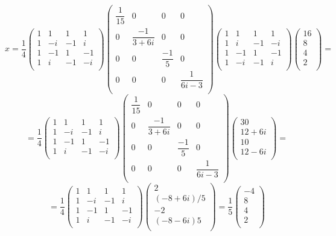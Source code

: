 \documentclass[a4paper,12pt]{article} %
\begin{document}
\[
x = \dfrac{1}{4}
\begin{pmatrix}
1&1&1&1\\
1&-i&-1&i\\
1&-1&1&-1\\
1&i&-1&-i\\
\end{pmatrix}
\begin{pmatrix}
\dfrac{1}{15}&0&0&0\\
0&\dfrac{-1}{3+6i}&0&0\\
0&0&\dfrac{-1}{5}&0\\
0&0&0&\dfrac{1}{6i-3}\\
\end{pmatrix}
\begin{pmatrix}
1&1&1&1\\
1&i&-1&-i\\
1&-1&1&-1\\
1&-i&-1&i\\
\end{pmatrix}
\begin{pmatrix}
16\\
8\\
4\\
2\\
\end{pmatrix}=
\]
\[
= \dfrac{1}{4}
\begin{pmatrix}
1&1&1&1\\
1&-i&-1&i\\
1&-1&1&-1\\
1&i&-1&-i\\
\end{pmatrix}
\begin{pmatrix}
\dfrac{1}{15}&0&0&0\\
0&\dfrac{-1}{3+6i}&0&0\\
0&0&\dfrac{-1}{5}&0\\
0&0&0&\dfrac{1}{6i-3}\\
\end{pmatrix}
\begin{pmatrix}
30\\
12+6i\\
10\\
12-6i\\
\end{pmatrix}=
\]
\[
=\dfrac{1}{4}
\begin{pmatrix}
1&1&1&1\\
1&-i&-1&i\\
1&-1&1&-1\\
1&i&-1&-i\\
\end{pmatrix}
\begin{pmatrix}
2\\
(-8+6i)/5\\
-2\\
(-8-6i)5\\
\end{pmatrix}=\dfrac{1}{5}
\begin{pmatrix}
-4\\
8\\
4\\
2\\
\end{pmatrix}
\]
\end{document}
